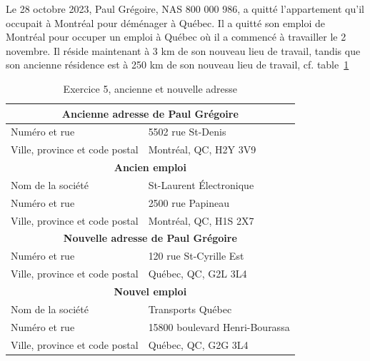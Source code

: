 \begin{question}
	Le 28 octobre 2023, Paul Grégoire, NAS 800 000 986, a quitté l'appartement qu'il occupait à Montréal  pour déménager à Québec. Il a quitté son emploi de Montréal pour occuper un emploi à Québec où il a commencé à travailler le 2 novembre. Il réside maintenant à 3 km de son nouveau lieu de travail, tandis que son ancienne résidence est à 250 km de son nouveau lieu de travail, cf. table~\ref{table:chap3Exercice5Adresses}
	\begin{table}
		\centering
		\begin{tabular}{|l|l|}
			\hline
			\multicolumn{2}{|c|}{\textbf{Ancienne adresse de Paul Grégoire}} \\ \hline
			Numéro et rue                  & 5502 rue St-Denis               \\ \hline
			Ville, province et code postal & Montréal, QC, H2Y 3V9           \\ \hline
			\multicolumn{2}{|c|}{\textbf{Ancien emploi}}                     \\ \hline
			Nom de la société              & St-Laurent Électronique         \\ \hline
			Numéro et rue                  & 2500 rue Papineau               \\ \hline
			Ville, province et code postal & Montréal, QC, H1S 2X7           \\ \hline
			\multicolumn{2}{|c|}{\textbf{Nouvelle adresse de Paul Grégoire}} \\ \hline
			Numéro et rue                  & 120 rue St-Cyrille Est          \\ \hline
			Ville, province et code postal & Québec, QC, G2L 3L4             \\ \hline
			\multicolumn{2}{|c|}{\textbf{Nouvel emploi}}                     \\ \hline
			Nom de la société              & Transports Québec               \\ \hline
			Numéro et rue                  & 15800 boulevard Henri-Bourassa  \\ \hline
			Ville, province et code postal & Québec, QC, G2G 3L4             \\ \hline
		\end{tabular}
		\caption{Exercice 5, ancienne et nouvelle adresse}
		\label{table:chap3Exercice5Adresses}
	\end{table}
	

\end{question}
